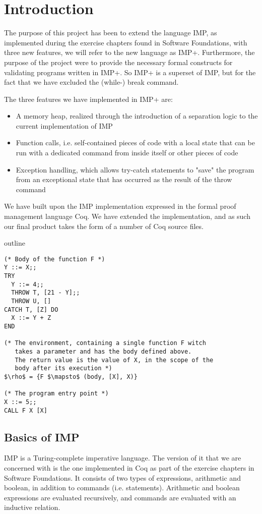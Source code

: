 
\section{Introduction}
The purpose of this project has been to extend the language IMP, as implemented during the exercise chapters found in Software Foundations, with three new features, we will refer to the new language as IMP+. Furthermore, the purpose of the project were to provide the necessary formal constructs for validating programs written in IMP+. So IMP+ is a superset of IMP, but for the fact that we have excluded the (while-) break command.

The three features we have implemented in IMP+ are:
\begin{itemize}
\item A memory heap, realized through the introduction of a separation logic to the current implementation of IMP
\item Function calls, i.e. self-contained pieces of code with a local state that can be run with a dedicated command from inside itself or other pieces of code
\item Exception handling, which allows try-catch statements to "save" the program from an exceptional state that has occurred as the result of the throw command
\end{itemize}

We have built upon the IMP implementation expressed in the formal proof management language Coq. We have extended the implementation, and as such our final product takes the form of a number of Coq source files.

outline

\begin{lstlisting}[mathescape=true,keepspaces=true,label=lst:imp-plus-ex,caption=A program written in IMP+ demonstrating assignment and throw/catch.]
(* Body of the function F *)
Y ::= X;;
TRY
  Y ::= 4;;
  THROW T, [21 - Y];;
  THROW U, []
CATCH T, [Z] DO
  X ::= Y + Z
END

(* The environment, containing a single function F witch
   takes a parameter and has the body defined above.
   The return value is the value of X, in the scope of the 
   body after its execution *)
$\rho$ = {F $\mapsto$ (body, [X], X)}

(* The program entry point *)
X ::= 5;;
CALL F X [X]
\end{lstlisting}

\subsection{Basics of IMP}
IMP is a Turing-complete imperative language. The version of it that we are concerned with is the one implemented in Coq as part of the exercise chapters in Software Foundations. It consists of two types of expressions, arithmetic and boolean, in addition to commands (i.e. statements). Arithmetic and boolean expressions are evaluated recursively, and commands are evaluated with an inductive relation.


